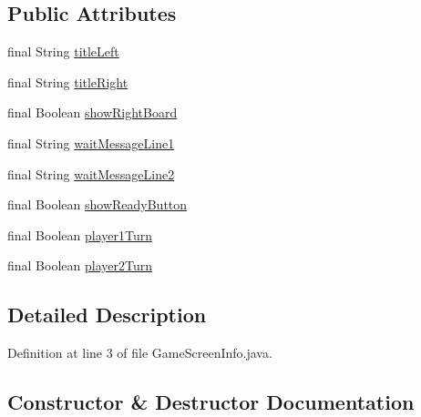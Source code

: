 \subsection*{Public Attributes}
\begin{DoxyCompactItemize}
\item 
final String \hyperlink{classsharedlib_1_1tuples_1_1_game_screen_info_a392cdcfa4234bd8eb9589cd524d3a356}{title\+Left}
\item 
final String \hyperlink{classsharedlib_1_1tuples_1_1_game_screen_info_ad7f7ecc83677d2a067d02f746dcd78b9}{title\+Right}
\item 
final Boolean \hyperlink{classsharedlib_1_1tuples_1_1_game_screen_info_a0f37c050a0cfbf35d993ca4af17df941}{show\+Right\+Board}
\item 
final String \hyperlink{classsharedlib_1_1tuples_1_1_game_screen_info_aa942419eb30486ee131a58a0077f7e9a}{wait\+Message\+Line1}
\item 
final String \hyperlink{classsharedlib_1_1tuples_1_1_game_screen_info_ae38bc6bfe2713b88a9b9fd1e1480d9a6}{wait\+Message\+Line2}
\item 
final Boolean \hyperlink{classsharedlib_1_1tuples_1_1_game_screen_info_a6ad33a0d9b3ccc289366498b863037d7}{show\+Ready\+Button}
\item 
final Boolean \hyperlink{classsharedlib_1_1tuples_1_1_game_screen_info_a38ed897b3243178155fe43f55c83556c}{player1\+Turn}
\item 
final Boolean \hyperlink{classsharedlib_1_1tuples_1_1_game_screen_info_ae6af422c349ee6dd17af8d2a585e2d2b}{player2\+Turn}
\end{DoxyCompactItemize}


\subsection{Detailed Description}


Definition at line 3 of file Game\+Screen\+Info.\+java.



\subsection{Constructor \& Destructor Documentation}
\hypertarget{classsharedlib_1_1tuples_1_1_game_screen_info_afb0ad82f66df017e2bf096e26d1fe9bc}{}\label{classsharedlib_1_1tuples_1_1_game_screen_info_afb0ad82f66df017e2bf096e26d1fe9bc} 
